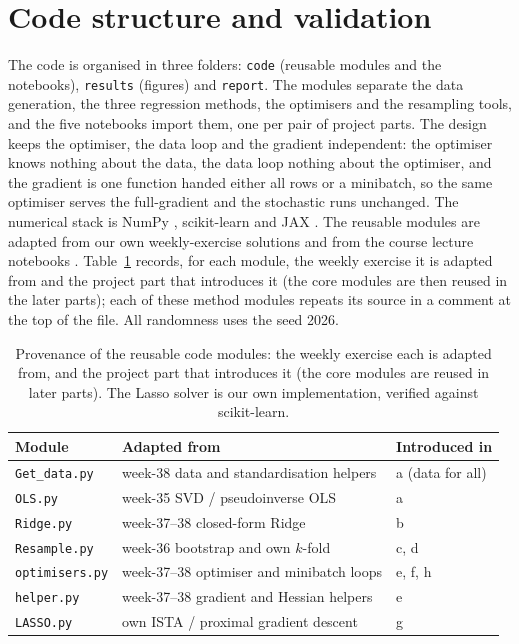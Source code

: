 \documentclass[a4paper,11pt]{article}
\begin{document}
\section{Code structure and validation}
\label{sec:code}
The code is organised in three folders: \texttt{code} (reusable modules and the
notebooks), \texttt{results} (figures) and \texttt{report}. The modules
separate the data generation, the three regression methods, the optimisers and
the resampling tools, and the five notebooks import them, one per pair of
project parts. The design keeps the optimiser, the data loop and the gradient
independent: the optimiser knows nothing about the data, the data loop nothing
about the optimiser, and the gradient is one function handed either all rows or
a minibatch, so the same optimiser serves the full-gradient and the stochastic
runs unchanged. The numerical stack is NumPy \cite{harris2020}, scikit-learn
\cite{pedregosa2011} and JAX \cite{jax2018}. The reusable modules are adapted
from our own weekly-exercise solutions and from the course lecture notebooks
\cite{hjorthjensen2026}. Table~\ref{tab:provenance} records, for each module, the
weekly exercise it is adapted from and the project part that introduces it (the
core modules are then reused in the later parts); each of these method modules
repeats its source in a comment at the top of the file. All randomness uses the
seed 2026.

\begin{table}[h]
\centering
\caption{Provenance of the reusable code modules: the weekly exercise each is
adapted from, and the project part that introduces it (the core modules are
reused in later parts). The Lasso solver is our own implementation, verified
against scikit-learn.}
\label{tab:provenance}
\begin{tabular}{lll}
\toprule
Module & Adapted from & Introduced in \\
\midrule
\texttt{Get\_data.py}   & week-38 data and standardisation helpers      & a (data for all) \\
\texttt{OLS.py}         & week-35 SVD / pseudoinverse OLS               & a \\
\texttt{Ridge.py}       & week-37--38 closed-form Ridge                 & b \\
\texttt{Resample.py}    & week-36 bootstrap and own $k$-fold            & c, d \\
\texttt{optimisers.py}  & week-37--38 optimiser and minibatch loops     & e, f, h \\
\texttt{helper.py}      & week-37--38 gradient and Hessian helpers      & e \\
\texttt{LASSO.py}       & own ISTA / proximal gradient descent          & g \\
\bottomrule
\end{tabular}
\end{table}
\end{document}
